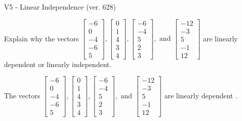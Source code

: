 \begin{exercise}
  \begin{exerciseTitle}V5 - Linear Independence (ver. 628)\end{exerciseTitle}
  \begin{exerciseStatement}
    Explain why the vectors \(\left[\begin{array}{r}
-6 \\
0 \\
-4 \\
-6 \\
5
\end{array}\right] , \left[\begin{array}{r}
0 \\
1 \\
4 \\
3 \\
4
\end{array}\right] , \left[\begin{array}{r}
-6 \\
-4 \\
5 \\
2 \\
3
\end{array}\right] , \text{ and } \left[\begin{array}{r}
-12 \\
-3 \\
5 \\
-1 \\
12
\end{array}\right]\) are linearly dependent or linearly independent.	


  \end{exerciseStatement}
  \begin{exerciseAnswer}
   The vectors \(\left[\begin{array}{r}
-6 \\
0 \\
-4 \\
-6 \\
5
\end{array}\right] , \left[\begin{array}{r}
0 \\
1 \\
4 \\
3 \\
4
\end{array}\right] , \left[\begin{array}{r}
-6 \\
-4 \\
5 \\
2 \\
3
\end{array}\right] , \text{ and } \left[\begin{array}{r}
-12 \\
-3 \\
5 \\
-1 \\
12
\end{array}\right]\) are 
  	 linearly dependent  .
  


  \end{exerciseAnswer}
\end{exercise}